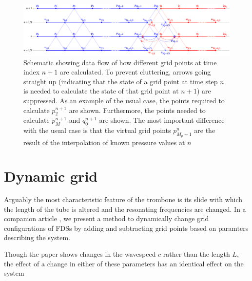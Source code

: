 \begin{figure}[t]
    \centering
    \includegraphics[width = \textwidth]{Figures/tromboneSchematic.eps}
    \caption{Schematic showing data flow of how different grid points at time index $n+1$ are calculated. To prevent cluttering, arrows going straight up (indicating that the state of a grid point at time step $n$ is needed to calculate the state of that grid point at $n+1$) are suppressed. As an example of the usual case, the points required to calculate $p_2^{n+1}$ are shown. Furthermore, the points needed to calculate $p_{M}^{n+1}$ and $q_0^{n+1}$ are shown. The most important difference with the usual case is that the virtual grid points $p_{M_p+1}^n$ %
    are the result of the interpolation of known pressure values at $n$ %
    \label{fig:dynamicGridSchematic}}
\end{figure}

\section{Dynamic grid}\label{sec:dynamicGrid}
Arguably the most characteristic feature of the trombone is its slide with which the length of the tube is altered and the resonating frequencies are changed. In a companion article \cite{Willemsen2021}, we present a method to dynamically change grid configurations of FDSs by adding and subtracting grid points based on paramters describing the system.

Though the paper shows changes in the wavespeed $c$ rather than the length $L$, the effect of a change in either of these parameters has an identical effect on the system 


